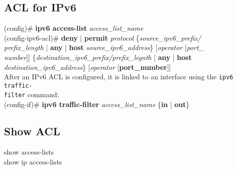\subsection{ACL for IPv6}
(config)\# \textbf{ipv6 access-list} \textit{access\_list\_name}\\
(config-ipv6-acl)\# \textbf{deny} | \textbf{permit} \textit{protocol} \{\textit{source\_ipv6\_prefix/\\prefix\_length} | \textbf{any} | \textbf{host} \textit{source\_ipv6\_address}\} [\textit{operator} [\textit{port\_\\number}]] \{\textit{destination\_ipv6\_prefix/prefix\_legnth} | \textbf{any} | \textbf{host} \\\textit{destination\_ipv6\_address}\} [\textit{operator} [\textbf{port\_number}]]\vspace{11pt}\\
\textrm{After an IPv6 ACL is configured, it is linked to an interface using the \texttt{ipv6 traffic-\\filter} command:}\vspace{2pt}\\
(config-if)\# \textbf{ipv6 traffic-filter} \textit{access\_list\_name} \{\textbf{in} | \textbf{out}\}
\subsection{Show ACL}
show access-lists\\
show ip access-lists